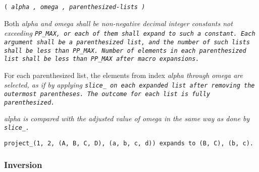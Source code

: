 \def\Subsubsection#1{\subsubsection{#1}
}


 \tt{(} \it{alpha} \tt{,} \it{omega} \tt{,} \it{parenthesized-lists} \tt{)}


Both \it{alpha} and \it{omega} shall be non-negative decimal integer constants
not exceeding \tt{PP_MAX}, or each of them shall expand to such a constant.
Each argument shall be a parenthesized list,
and the number of such lists shall be less than \tt{PP_MAX}.
Number of elements in each parenthesized list
shall be less than \tt{PP_MAX} after macro expansions.


For each parenthesized list, the elements from index \it{alpha}
through \it{omega} are selected, as if by applying \tt{slice_}
on each expanded list after removing the outermost parentheses.
The outcome for each list is fully parenthesized.

\note \it{alpha} is compared with the adjusted value
of \it{omega} in the same way as done by \tt{slice_}.

\example \tt{project_(1, 2, (A, B, C, D), (a, b, c, d))}
expands to \tt{(B, C), (b, c)}.

\Subsubsection{Inversion}
